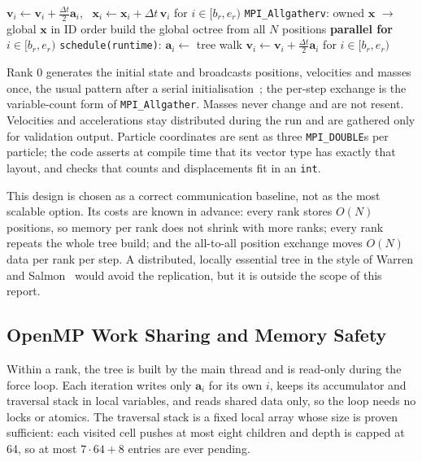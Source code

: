 \documentclass[10pt,a4paper,twocolumn,twoside]{rho-class/rho}
\begin{document}
\begin{algorithm}[t]
\caption{One timestep on rank $r$ (owned IDs $[b_r, e_r)$)}
\label{alg:step}
\begin{algorithmic}[1]
\State $\mathbf{v}_i \gets \mathbf{v}_i + \tfrac{\Delta t}{2}\mathbf{a}_i$, \ $\mathbf{x}_i \gets \mathbf{x}_i + \Delta t\,\mathbf{v}_i$ \quad for $i \in [b_r, e_r)$
\State \texttt{MPI\_Allgatherv}: owned $\mathbf{x}$ $\to$ global $\mathbf{x}$ in ID order
\State build the global octree from all $N$ positions
\State \textbf{parallel for} $i \in [b_r, e_r)$ \texttt{schedule(runtime)}: $\mathbf{a}_i \gets$ tree walk
\State $\mathbf{v}_i \gets \mathbf{v}_i + \tfrac{\Delta t}{2}\mathbf{a}_i$ \quad for $i \in [b_r, e_r)$
\end{algorithmic}
\end{algorithm}

Rank 0 generates the initial state and broadcasts positions, velocities and masses once, the usual pattern after a serial initialisation~\cite{Lecture8}; the per-step exchange is the variable-count form of \texttt{MPI\_Allgather}. Masses never change and are not resent. Velocities and accelerations stay distributed during the run and are gathered only for validation output. Particle coordinates are sent as three \texttt{MPI\_DOUBLE}s per particle; the code asserts at compile time that its vector type has exactly that layout, and checks that counts and displacements fit in an \texttt{int}.

This design is chosen as a correct communication baseline, not as the most scalable option. Its costs are known in advance: every rank stores $O(N)$ positions, so memory per rank does not shrink with more ranks; every rank repeats the whole tree build; and the all-to-all position exchange moves $O(N)$ data per rank per step. A distributed, locally essential tree in the style of Warren and Salmon~\cite{WarrenSalmon1993} would avoid the replication, but it is outside the scope of this report.

\subsection{OpenMP Work Sharing and Memory Safety}
Within a rank, the tree is built by the main thread and is read-only during the force loop. Each iteration writes only $\mathbf{a}_i$ for its own $i$, keeps its accumulator and traversal stack in local variables, and reads shared data only, so the loop needs no locks or atomics. The traversal stack is a fixed local array whose size is proven sufficient: each visited cell pushes at most eight children and depth is capped at 64, so at most $7 \cdot 64 + 8$ entries are ever pending.
\end{document}
